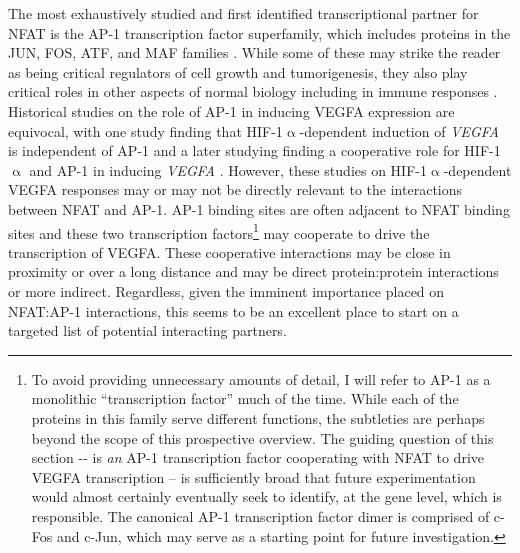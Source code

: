 The most exhaustively studied and first identified transcriptional partner for NFAT is the AP\hyp{}1 transcription factor superfamily, which includes proteins in the JUN, FOS, ATF, and MAF families \citep{Boise1993}. While some of these may strike the reader as being critical regulators of cell growth and tumorigenesis, they also play critical roles in other aspects of normal biology including in immune responses \citep{Macian2001, Eferl2003}. Historical studies on the role of AP\hyp{}1 in inducing VEGFA expression are equivocal, with one study finding that HIF\hyp{}1$\upalpha$\hyp{}dependent induction of \textit{VEGFA} is independent of AP\hyp{}1 and a later studying finding a cooperative role for HIF\hyp{}1$\upalpha$ and AP\hyp{}1 in inducing \textit{VEGFA} \citep{Finkenzeller1995, Shih2001}. However, these studies on HIF\hyp{}1$\upalpha$\hyp{}dependent VEGFA responses may or may not be directly relevant to the interactions between NFAT and AP\hyp{}1. AP\hyp{}1 binding sites are often adjacent to NFAT binding sites and these two transcription factors\footnote{To avoid providing unnecessary amounts of detail, I will refer to AP\hyp{}1 as a monolithic ``transcription factor'' much of the time. While each of the proteins in this family serve different functions, the subtleties are perhaps beyond the scope of this prospective overview. The guiding question of this section \hyp{}\hyp{} is \textit{an} AP\hyp{}1 transcription factor cooperating with NFAT to drive VEGFA transcription -- is sufficiently broad that future experimentation would almost certainly eventually seek to identify, at the gene level, which is responsible. The canonical AP\hyp{}1 transcription factor dimer is comprised of c\hyp{}Fos and c\hyp{}Jun, which may serve as a starting point for future investigation.} may cooperate to drive the transcription of VEGFA. These cooperative interactions may be close in proximity or over a long distance and may be direct protein:protein interactions or more indirect. Regardless, given the imminent importance placed on NFAT:AP\hyp{}1 interactions, this seems to be an excellent place to start on a targeted list of potential interacting partners.

